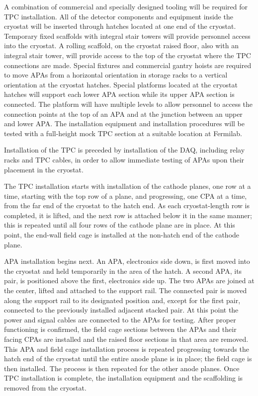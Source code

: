 A combination of commercial and specially designed tooling will be
required for TPC installation. All of the detector components and
equipment inside the cryostat will be inserted through hatches
located at one end of the cryostat.  Temporary fixed scaffolds with integral
stair towers will  provide personnel access
into the cryostat. A rolling scaffold, on the cryostat raised floor, also with an integral stair tower,
will provide access to the top
of the cryostat where the TPC connections are made.  Special fixtures
and commercial gantry hoists are required to move APAs from a
horizontal orientation in storage racks to a vertical orientation at
the cryostat hatches. Special platforms located at the
cryostat hatches will support each lower APA section while its upper APA
section is connected. The platform will have multiple levels to allow
personnel to access the connection points at the top of an APA and at the
junction between an upper and lower APA. The installation equipment
and installation procedures will be tested with a full-height mock TPC
section at a suitable location at Fermilab.

%
Installation of the TPC is preceded by installation of the DAQ, including relay racks and TPC cables, 
 in order to allow immediate testing of APAs upon their placement in the cryostat.

The TPC installation starts with installation of the cathode planes, one 
row at a time, starting with the top row of a plane, and progressing, one CPA at a time, 
from the far end of the
cryostat to the hatch end.  As each cryostat-length row is completed, 
it is lifted, and the next row
is attached below it in the same manner; this is repeated until all four rows of the cathode plane are in place.
At this point, the end-wall field cage is installed at the non-hatch end of
the cathode plane. 

APA installation begins next. %
An APA, electronics side down, is first moved %
into the cryostat and held temporarily in the area of the
hatch. A second APA, its pair, is positioned above 
the first, electronics side up. The two APAs are joined at the
center, lifted and attached to the support rail. The connected pair is 
moved along the support rail to its designated position and, except for the first pair,
connected to the previously installed adjacent stacked pair.  
%
At this point the power and signal
cables are connected to the APAs for testing. After proper functioning
is confirmed, the field cage
sections between the APAs and their facing CPAs are installed and the raised floor
sections in that area are removed.  This APA and field cage installation process is repeated progressing towards 
the hatch end of the cryostat until the entire anode plane is in place; the field cage is then
installed. The process is then repeated
for the other anode planes. Once TPC installation is complete, the installation equipment and
the scaffolding is removed from the cryostat.


